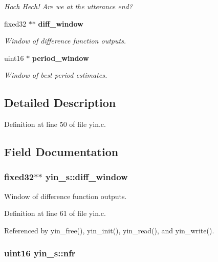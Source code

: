 \begin{DoxyCompactItemize}
\begin{DoxyCompactList}\small\item\em Hoch Hech! Are we at the utterance end? \end{DoxyCompactList}\item 
fixed32 $\ast$$\ast$ {\bf diff\-\_\-window}
\begin{DoxyCompactList}\small\item\em Window of difference function outputs. \end{DoxyCompactList}\item 
uint16 $\ast$ {\bf period\-\_\-window}
\begin{DoxyCompactList}\small\item\em Window of best period estimates. \end{DoxyCompactList}\end{DoxyCompactItemize}


\subsection{Detailed Description}


Definition at line 50 of file yin.\-c.



\subsection{Field Documentation}
\subsubsection[{diff\-\_\-window}]{\setlength{\rightskip}{0pt plus 5cm}fixed32$\ast$$\ast$ yin\-\_\-s\-::diff\-\_\-window}\label{structyin__s_a932e8441ff0aa6b9b37f5055c97a4d11}


Window of difference function outputs. 



Definition at line 61 of file yin.\-c.



Referenced by yin\-\_\-free(), yin\-\_\-init(), yin\-\_\-read(), and yin\-\_\-write().

\subsubsection[{nfr}]{\setlength{\rightskip}{0pt plus 5cm}uint16 yin\-\_\-s\-::nfr}\label{structyin__s_af4f11d14a36bbdc19863fa8335237423}


